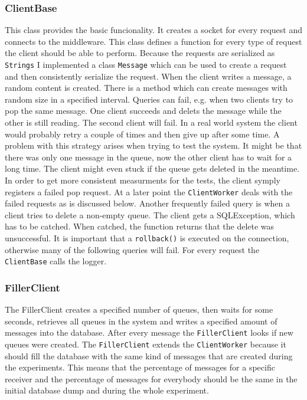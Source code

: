\documentclass[
10pt, %
a4paper, %
oneside, %
headinclude,footinclude, %
BCOR5mm, %
]{scrartcl}
\begin{document}
\subsubsection{ClientBase}
This class provides the basic funcionality. It creates a socket for every request and connects to the middleware. This class defines a function for every type of request the client should be able to perform. Because the requests are serialized as \texttt{Strings} I implemented a class \texttt{Message} which can be used to create a request and then consistently serialize the request. When the client writes a message, a random content is created. There is a method which can create messages with random size in a specified interval.
Queries can fail, e.g. when two clients try to pop the same message. One client succeeds and delets the message while the other is still reading. The second client will fail. In a real world system the client would probably retry a couple of times and then give up after some time. A problem with this strategy arises when trying to test the system. It might be that there was only one message in the queue, now the other client has to wait for a long time. The client might even stuck if the queue gets deleted in the meantime. In order to get more consistent measurments for the tests, the client symply registers a failed pop request. At a later point the \texttt{ClientWorker} deals with the failed requests as is discussed below.
Another frequently failed query is when a client tries to delete a non-empty queue. The client gets a SQLException, which has to be catched. When catched, the function returns that the delete was unsuccessful. It is important that a \texttt{rollback()} is executed on the connection, otherwise many of the following queries will fail.
For every request the \texttt{ClientBase} calls the logger.

\subsubsection{FillerClient}
The FillerClient creates a specified number of queues, then waits for some seconds, retrieves all queues in the system and writes a specified amount of messages into the database. After every message the \texttt{FillerClient} looks if new queues were created. The \texttt{FillerClient} extends the \texttt{ClientWorker} because it should fill the database with the same kind of messages that are created during the experiments. This means that the percentage of messages for a specific receiver and the percentage of messages for everybody should be the same in the initial database dump and during the whole experiment.
\end{document}
